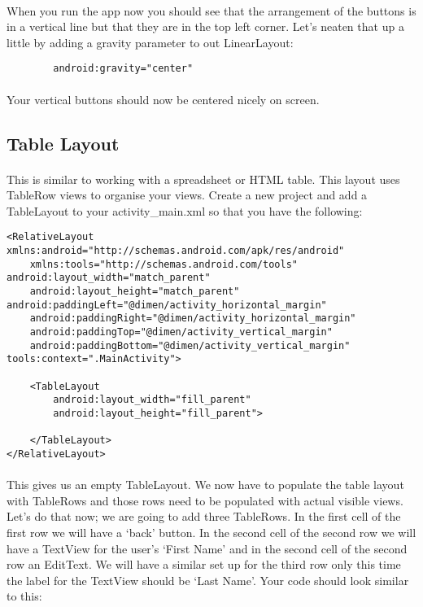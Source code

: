 \paragraph{} When you run the app now you should see that the arrangement of the buttons is in a vertical line but that they are in the top left corner. Let's neaten that up a little by adding a gravity parameter to out LinearLayout:

\begin{lstlisting}
        android:gravity="center"
\end{lstlisting}

\paragraph{} Your vertical buttons should now be centered nicely on screen.

\subsection{Table Layout}
\paragraph{} This is similar to working with a spreadsheet or HTML table. This layout uses TableRow views to organise your views. Create a new project and add a TableLayout to your activity\_main.xml so that you have the following:

\begin{lstlisting}
<RelativeLayout xmlns:android="http://schemas.android.com/apk/res/android"
    xmlns:tools="http://schemas.android.com/tools" android:layout_width="match_parent"
    android:layout_height="match_parent" android:paddingLeft="@dimen/activity_horizontal_margin"
    android:paddingRight="@dimen/activity_horizontal_margin"
    android:paddingTop="@dimen/activity_vertical_margin"
    android:paddingBottom="@dimen/activity_vertical_margin" tools:context=".MainActivity">

    <TableLayout
        android:layout_width="fill_parent"
        android:layout_height="fill_parent">

    </TableLayout>
</RelativeLayout>
\end{lstlisting}

\paragraph{} This gives us an empty TableLayout. We now have to populate the table layout with TableRows and those rows need to be populated with actual visible views. Let's do that now; we are going to add three TableRows. In the first cell of the first row we will have a `back' button. In the second cell of the second row we will have a TextView for the user's `First Name' and in the second cell of the second row an EditText. We will have a similar set up for the third row only this time the label for the TextView should be `Last Name'. Your code should look similar to this:

